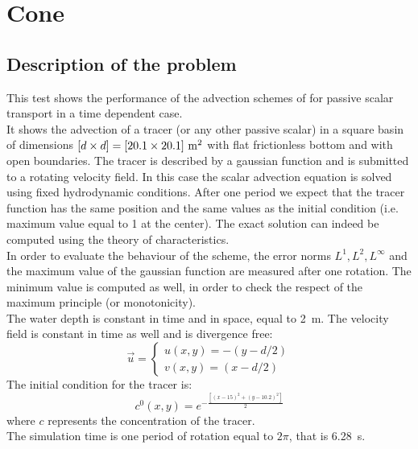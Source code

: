 \chapter{Cone}
%

\section{Description of the problem}
%
This test shows the performance of the advection schemes of  for passive scalar transport in a time dependent case. \\
%
It shows the advection of a tracer (or any other passive scalar) in a square basin of dimensions $[d \times d]=[20.1 \times 20.1]~\rm{m}^2$ with flat frictionless bottom and with open boundaries. The tracer is described by a gaussian function and is submitted to a rotating velocity field. In this case the scalar advection equation is solved using fixed hydrodynamic conditions. After one period we expect that the tracer function has the same position and the same values as the initial condition (i.e. maximum value equal to 1 at the center). The exact solution can indeed be computed using the theory of characteristics. \\
In order to evaluate the behaviour of the scheme, the error norms $L^1, L^2, L^{\infty}$ and the maximum value of the gaussian function are measured after one rotation. The minimum value is computed as well, in order to check the respect of the maximum principle (or monotonicity). \\
The water depth is constant in time and in space, equal to 2~m. The velocity field is constant in time as well and is divergence free:
\begin{equation*}
  \vec{u}=\left\{
         \begin{array}{l}
          u(x,y)=-(y-d/2) \\
          v(x,y)=(x-d/2)
         \end{array}\right.
\end{equation*}
The initial condition for the tracer is:
\begin{equation*}
 c^0(x,y)=e^{-\frac{[(x-15)^2+(y-10.2)^2]}{2}}
\end{equation*}
where $c$ represents the concentration of the tracer. \\
The simulation time is one period of rotation equal to $2\pi$, that is 6.28~s.
%
%
